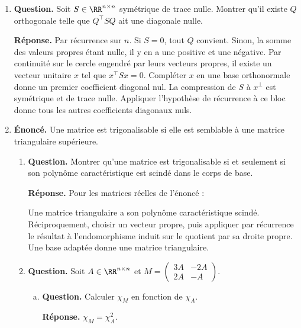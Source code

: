 \documentclass[12pt, a4paper]{article}
\begin{document}
\begin{enumerate}[label=9.\arabic*., start=94]
\begin{minipage}[t]{\linewidth}
\begin{enumerate}[\arabic*.]
\end{enumerate}
\end{minipage}

  \item \begin{minipage}[t]{\linewidth}\raggedright
\textbf{Question.} Soit $S\in\RR^{n\times n}$ symétrique de trace nulle. Montrer qu’il existe $Q$ orthogonale telle que $Q^\top SQ$ ait une diagonale nulle.
\par\smallskip
\textbf{Réponse.} Par récurrence sur $n$. Si $S=0$, tout $Q$ convient.
    Sinon, la somme des valeurs propres étant nulle, il y en a une positive et une négative.
    Par continuité sur le cercle engendré par leurs vecteurs propres, il existe un vecteur unitaire $x$ tel que $x^\top Sx=0$.
    Compléter $x$ en une base orthonormale donne un premier coefficient diagonal nul.
    La compression de $S$ à $x^\perp$ est symétrique et de trace nulle.
    Appliquer l'hypothèse de récurrence à ce bloc donne tous les autres coefficients diagonaux nuls.
\end{minipage}

  \item \begin{minipage}[t]{\linewidth}\raggedright
\textbf{Énoncé.} Une matrice est trigonalisable si elle est semblable à une matrice triangulaire supérieure.

\begin{enumerate}[\arabic*.]
        \item \textbf{Question.} Montrer qu’une matrice est trigonalisable si et seulement si son polynôme caractéristique est scindé dans le corps de base.
\par\smallskip
\textbf{Réponse.} Pour les matrices réelles de l'énoncé :

Une matrice triangulaire a son polynôme caractéristique scindé.
        Réciproquement, choisir un vecteur propre, puis appliquer par récurrence le résultat à l'endomorphisme induit sur le quotient par sa droite propre.
        Une base adaptée donne une matrice triangulaire.

  \item \textbf{Question.} Soit $A\in\RR^{n\times n}$ et $M=\begin{pmatrix}3A&-2A\\2A&-A\end{pmatrix}$.
\begin{enumerate}[a.]
            \item \textbf{Question.} Calculer $\chi_M$ en fonction de $\chi_A$.
\par\smallskip
\textbf{Réponse.} $\chi_M=\chi_A^2$.


\end{enumerate}
\end{enumerate}
\end{minipage}
\end{enumerate}
\end{document}
